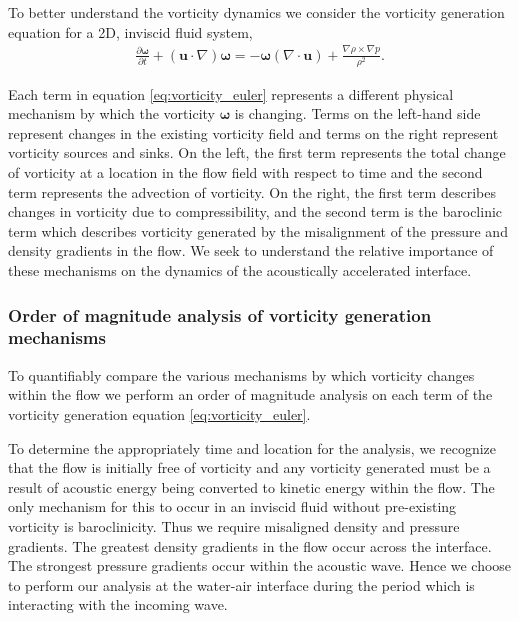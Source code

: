 To better understand the vorticity dynamics we consider the vorticity
generation equation for a 2D, inviscid fluid system,
\begin{align} \label{eq:vorticity_euler}
  \frac{\partial \boldsymbol{\omega}}{\partial t}+\left(\boldsymbol{u}\cdot\nabla\right)\boldsymbol{\omega} =%
  - \boldsymbol{\omega}\left(\nabla\cdot\boldsymbol{u}\right) + \frac{\nabla\rho\times\nabla p}{\rho^2}.%
\end{align}

Each term in equation \eqref{eq:vorticity_euler} represents a
different physical mechanism by which the vorticity
$\boldsymbol{\omega}$ is changing. Terms on the left-hand side
represent changes in the existing vorticity field and terms on the
right represent vorticity sources and sinks. On the left, the first
term represents the total change of vorticity at a location in the
flow field with respect to time and the second term represents the
advection of vorticity. On the right, the first term describes changes
in vorticity due to compressibility, and the second term is the
baroclinic term which describes vorticity generated by the
misalignment of the pressure and density gradients in the flow. We
seek to understand the relative importance of these mechanisms on the
dynamics of the acoustically accelerated interface.
% 
% 
\subsubsection{Order of magnitude analysis of vorticity generation mechanisms}
\label{subsubsec:oom_analysis}
To quantifiably compare the various mechanisms by which vorticity
changes within the flow we perform an order of magnitude analysis on
each term of the vorticity generation equation
\eqref{eq:vorticity_euler}.

To determine the appropriately time and location for the analysis, we
recognize that the flow is initially free of vorticity and any
vorticity generated must be a result of acoustic energy being
converted to kinetic energy within the flow. The only mechanism for
this to occur in an inviscid fluid without pre-existing vorticity is
baroclinicity. Thus we require misaligned density and pressure
gradients. The greatest density gradients in the flow occur across the
interface. The strongest pressure gradients occur within the acoustic
wave. Hence we choose to perform our analysis at the water-air
interface during the period which is interacting with the incoming
wave.

